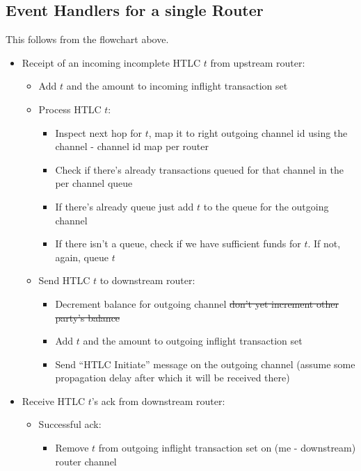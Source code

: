 \documentclass[a4paper]{article}
\begin{document}
\subsection{Event Handlers for a single Router}
This follows from the flowchart above. 
\begin{itemize}
    \item Receipt of an incoming incomplete HTLC $t$ from upstream router: 
        \begin{itemize}
            \item Add $t$ and the amount to incoming inflight transaction set
             \item Process HTLC $t$:
                \begin{itemize}
                    \item Inspect next hop for $t$, map it to right outgoing channel id using the channel - channel id map per router
                    \item Check if there's already transactions queued for that channel in the per channel queue
                    \item If there's already queue just add $t$ to the queue for the outgoing channel
                    \item If there isn't a queue, check if we have sufficient funds for $t$. If not, again, queue $t$
                \end{itemize}
            \item Send HTLC $t$ to downstream router:
                \begin{itemize}
                    \item Decrement balance for outgoing channel \sout{don't yet increment other party's balance}
                    \item Add $t$ and the amount to outgoing inflight transaction set
                    \item Send ``HTLC Initiate'' message on the outgoing channel (assume some propagation delay after which it will be received there)
                \end{itemize}
        \end{itemize}
    \item Receive HTLC $t$'s ack from downstream router:
        \begin{itemize}
            \item Successful ack:
                \begin{itemize}
                    \item Remove $t$ from outgoing inflight transaction set on (me - downstream) router channel

\end{itemize}
\end{itemize}
\end{itemize}
\end{document}

